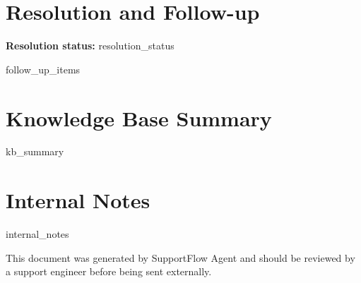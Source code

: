 \documentclass[11pt,a4paper]{article}
\begin{document}
\section*{Resolution and Follow-up}
\textbf{Resolution status:} {{resolution_status}}

\begin{itemize}
{{follow_up_items}}
\end{itemize}

\section*{Knowledge Base Summary}
{{kb_summary}}

\section*{Internal Notes}
{{internal_notes}}

\vfill
{\footnotesize\textcolor{muted}{This document was generated by SupportFlow Agent and should be reviewed by a support engineer before being sent externally.}}
\end{document}
